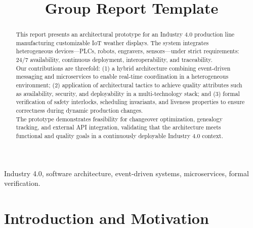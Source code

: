 \documentclass[conference]{IEEEtran}
\begin{document}
\title{Group Report Template}

\author{
}

\maketitle

\IEEEpubidadjcol
\begin{abstract}
This report presents an architectural prototype for an Industry 4.0 production line manufacturing customizable IoT weather displays. The system integrates heterogeneous devices—PLCs, robots, engravers, sensors—under strict requirements: 24/7 availability, continuous deployment, interoperability, and traceability. \\

Our contributions are threefold: (1) a hybrid architecture combining event-driven messaging and microservices to enable real-time coordination in a heterogeneous environment; (2) application of architectural tactics to achieve quality attributes such as availability, security, and deployability in a multi-technology stack; and (3) formal verification of safety interlocks, scheduling invariants, and liveness properties to ensure correctness during dynamic production changes. \\

The prototype demonstrates feasibility for changeover optimization, genealogy tracking, and external API integration, validating that the architecture meets functional and quality goals in a continuously deployable Industry 4.0 context.

\end{abstract}

\begin{IEEEkeywords}
Industry 4.0, software architecture, event-driven systems, microservices, formal verification.
\end{IEEEkeywords}


\section{Introduction and Motivation}

\end{document}
